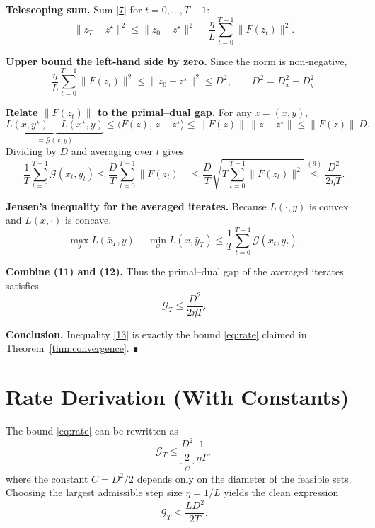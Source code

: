 \documentclass{article}
\begin{document}
\begin{enumerate}[label=\textbf{[Step \arabic*]}]
\item \textbf{Telescoping sum.}  
Sum \eqref{7} for $t=0,\dots,T-1$:
\[
\|z_{T}-z^{\star}\|^{2}
\le \|z_{0}-z^{\star}\|^{2}
-\frac{\eta}{L}\sum_{t=0}^{T-1}\|F(z_{t})\|^{2}. \tag{8}
\]

\item \textbf{Upper bound the left‑hand side by zero.}  
Since the norm is non‑negative,
\[
\frac{\eta}{L}\sum_{t=0}^{T-1}\|F(z_{t})\|^{2}
\le \|z_{0}-z^{\star}\|^{2}\le D^{2},\qquad 
D^{2}=D_{x}^{2}+D_{y}^{2}. \tag{9}
\]

\item \textbf{Relate $\|F(z_{t})\|$ to the primal–dual gap.}  
For any $z=(x,y)$,
\[
\underbrace{L(x,y^{\star})-L(x^{\star},y)}_{\displaystyle =\mathcal{G}(x,y)}
\le \langle F(z),\,z-z^{\star}\rangle
\le \|F(z)\|\,\|z-z^{\star}\|\le \|F(z)\|\,D. \tag{10}
\]
Dividing by $D$ and averaging over $t$ gives
\[
\frac{1}{T}\sum_{t=0}^{T-1}\mathcal{G}(x_{t},y_{t})
\le \frac{D}{T}\sum_{t=0}^{T-1}\|F(z_{t})\|
\le \frac{D}{T}\sqrt{T\sum_{t=0}^{T-1}\|F(z_{t})\|^{2}}
\stackrel{(9)}{\le}\frac{D^{2}}{2\eta T}. \tag{11}
\]

\item \textbf{Jensen’s inequality for the averaged iterates.}  
Because $L(\cdot ,y)$ is convex and $L(x,\cdot )$ is concave,
\[
\max_{y}L(\bar{x}_{T},y)-\min_{x}L(x,\bar{y}_{T})
\le \frac{1}{T}\sum_{t=0}^{T-1}\mathcal{G}(x_{t},y_{t}). \tag{12}
\]

\item \textbf{Combine (11) and (12).}  
Thus the primal–dual gap of the averaged iterates satisfies
\[
\mathcal{G}_{T}
\le \frac{D^{2}}{2\eta T}. \tag{13}
\]

\item \textbf{Conclusion.}  
Inequality \eqref{13} is exactly the bound \eqref{eq:rate} claimed in Theorem~\ref{thm:convergence}. ∎
\end{enumerate}

\section*{Rate Derivation (With Constants)}\label{sec:rate}
The bound \eqref{eq:rate} can be rewritten as
\[
\mathcal{G}_{T}\le \underbrace{\frac{D^{2}}{2}}_{\displaystyle C}\,\frac{1}{\eta T},
\]
where the constant $C=D^{2}/2$ depends only on the diameter of the feasible sets.  
Choosing the largest admissible step size $\eta=1/L$ yields the clean expression
\[
\mathcal{G}_{T}\le \frac{L D^{2}}{2T}. \tag{R}
\]
\end{document}
